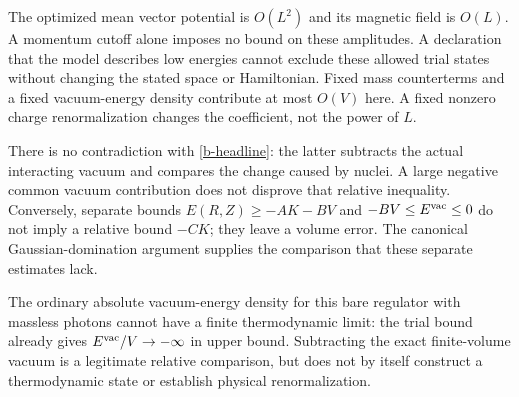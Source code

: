 The optimized mean vector potential is $O(L^2)$ and its magnetic
field is $O(L)$. A momentum cutoff alone imposes no bound on these
amplitudes. A declaration that the model describes low energies
cannot exclude these allowed trial states without changing the
stated space or Hamiltonian. Fixed mass counterterms and a fixed
vacuum-energy density contribute at most $O(V)$ here. A fixed
nonzero charge renormalization changes the coefficient, not the
power of $L$.

There is no contradiction with \eqref{b-headline}: the latter
subtracts the actual interacting vacuum and compares the change
caused by nuclei. A large negative common vacuum contribution does
not disprove that relative inequality. Conversely, separate bounds
$E(R,Z)\ge-AK-BV$ and $-BV\le E^{\mathrm{vac}}\le0$ do not imply a
relative bound $-CK$; they leave a volume error. The canonical
Gaussian-domination argument supplies the comparison that these
separate estimates lack.

The ordinary absolute vacuum-energy density for this bare regulator
with massless photons cannot have a finite thermodynamic limit: the trial bound
already gives $E^{\mathrm{vac}}/V\to-\infty$ in upper bound. Subtracting
the exact finite-volume vacuum is a legitimate relative comparison,
but does not by itself construct a thermodynamic state or establish
physical renormalization.
